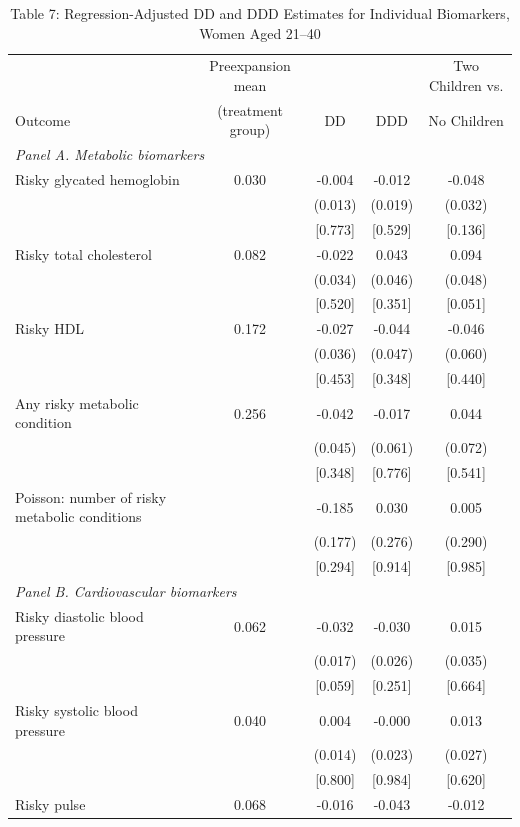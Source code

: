 \begin{table}[htbp]
\centering
\caption{Table 7: Regression-Adjusted DD and DDD Estimates for Individual Biomarkers, Women Aged 21--40}
\small
\begin{tabular}{p{5.5cm}cccc}
\toprule
 & Preexpansion mean & & & Two Children vs. \\
Outcome & (treatment group) & DD & DDD & No Children \\
\midrule
\multicolumn{5}{l}{\textit{Panel A. Metabolic biomarkers}} \\
\addlinespace
Risky glycated hemoglobin & 0.030 & -0.004 & -0.012 & -0.048 \\
 & & (0.013) & (0.019) & (0.032) \\
 & & [0.773] & [0.529] & [0.136] \\
\addlinespace
Risky total cholesterol & 0.082 & -0.022 & 0.043 & 0.094 \\
 & & (0.034) & (0.046) & (0.048) \\
 & & [0.520] & [0.351] & [0.051] \\
\addlinespace
Risky HDL & 0.172 & -0.027 & -0.044 & -0.046 \\
 & & (0.036) & (0.047) & (0.060) \\
 & & [0.453] & [0.348] & [0.440] \\
\addlinespace
Any risky metabolic condition & 0.256 & -0.042 & -0.017 & 0.044 \\
 & & (0.045) & (0.061) & (0.072) \\
 & & [0.348] & [0.776] & [0.541] \\
\addlinespace
Poisson: number of risky metabolic conditions &  & -0.185 & 0.030 & 0.005 \\
 & & (0.177) & (0.276) & (0.290) \\
 & & [0.294] & [0.914] & [0.985] \\
\midrule
\multicolumn{5}{l}{\textit{Panel B. Cardiovascular biomarkers}} \\
\addlinespace
Risky diastolic blood pressure & 0.062 & -0.032 & -0.030 & 0.015 \\
 & & (0.017) & (0.026) & (0.035) \\
 & & [0.059] & [0.251] & [0.664] \\
\addlinespace
Risky systolic blood pressure & 0.040 & 0.004 & -0.000 & 0.013 \\
 & & (0.014) & (0.023) & (0.027) \\
 & & [0.800] & [0.984] & [0.620] \\
\addlinespace
Risky pulse & 0.068 & -0.016 & -0.043 & -0.012 \\

\end{tabular}
\end{table}
